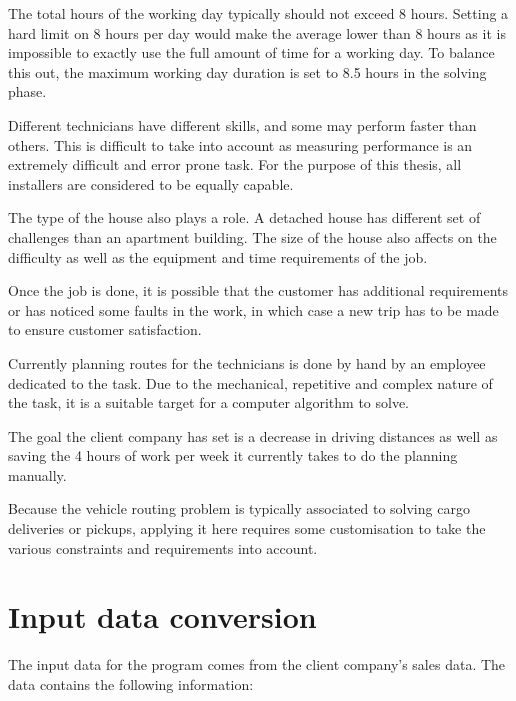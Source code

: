 The total hours of the working day typically should not exceed 8 hours. Setting a hard limit on 8 hours per day would make the average lower than 8 hours as it is impossible to exactly use the full amount of time for a working day. To balance this out, the maximum working day duration is set to 8.5 hours in the solving phase. 

Different technicians have different skills, and some may perform faster than others. This is difficult to take into account as measuring performance is an extremely difficult and error prone task. For the purpose of this thesis, all installers are considered to be equally capable.

The type of the house also plays a role. A detached house has different set of challenges than an apartment building. The size of the house also affects on the difficulty as well as the equipment and time requirements of the job.

Once the job is done, it is possible that the customer has additional requirements or has noticed some faults in the work, in which case a new trip has to be made to ensure customer satisfaction. 

Currently planning routes for the technicians is done by hand by an employee dedicated to the task. Due to the mechanical, repetitive and complex nature of the task, it is a suitable target for a computer algorithm to solve.

The goal the client company has set is a decrease in driving distances as well as saving the 4 hours of work per week it currently takes to do the planning manually.


Because the vehicle routing problem is typically associated to solving cargo deliveries or pickups, applying it here requires some customisation to take the various constraints and requirements into account. 

\section{Input data conversion}
\label{subsection:dataconversion}

The input data for the program comes from the client company's sales data. The data contains the following information:

